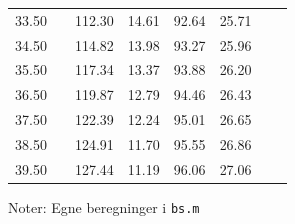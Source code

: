 \documentclass{article}
\begin{document}
\begin{table}[h]
{\begin{tabularx}{\linewidth}{cXcccccr}
         33.50  &&      112.30  &       14.61   &      92.64  &       25.71\\
         34.50  &&      114.82  &       13.98   &      93.27  &       25.96\\
         35.50  &&      117.34  &       13.37   &      93.88   &      26.20\\
         36.50  &&      119.87  &       12.79   &      94.46  &       26.43\\
         37.50  &&      122.39  &       12.24   &      95.01  &       26.65\\
         38.50  &&      124.91  &       11.70   &      95.55  &       26.86\\
         39.50  &&      127.44  &       11.19   &      96.06  &       27.06\\
	\bottomrule[1pt]
	\end{tabularx}}
	\begin{minipage}{\linewidth}
		\footnotesize{Noter: Egne beregninger i \texttt{bs.m} }
	\end{minipage}
\end{table}	

\clearpage 


 
\end{document}
